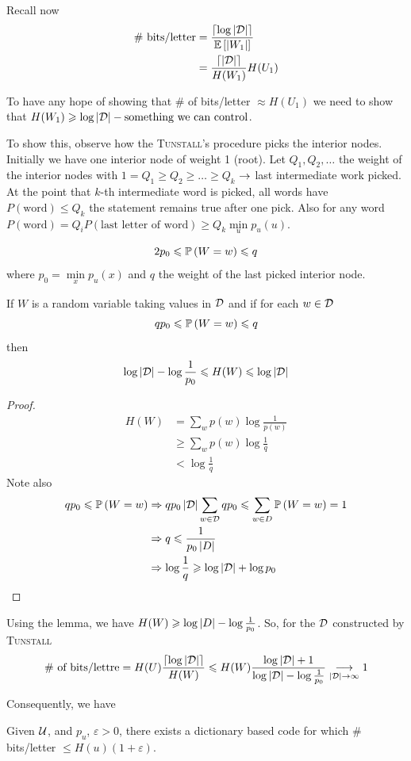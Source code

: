 Recall now 
\[
    \begin{aligned}
        \text{\# bits/letter} &= \frac{ \left\lceil \log\left\lvert\mathcal{D}\right\rvert \right\rceil}{\mathbb{E}\left[ \left\lvert W_1\right\rvert \right]}\\
        &= \frac{\left\lceil \left\lvert\mathcal{D}\right\rvert \right\rceil}{H(W_1)} H(U_1)
    \end{aligned}
\]

To have any hope of showing that \# of bits/letter $\approx H(U_1)$ we need to show that $H(W_1) \geqslant \log \left\lvert\mathcal{D}\right\rvert - \text{something we can control}$.

To show this, observe how the \textsc{Tunstall}'s procedure picks the interior nodes. Initially we have one interior node of weight 1 (root). Let $Q_1,Q_2,\ldots$ the weight of the interior nodes with $1=Q_1 \geqslant Q_2 \geqslant \ldots \geqslant Q_k$ $\rightarrow$ last intermediate work picked. At the point that $k$-th intermediate word is picked, all words have $P(\text{word}) \leqslant Q_k$ the statement remains true after one pick. Also for any word $P(\text{word}) = Q_i P(\text{last letter of word}) \geqslant Q_k \min\limits_up_u(u)$.

\[
    2p_0 \leqslant \mathbb{P}\left( W=w \right) \leqslant q
\]
where
$p_0= \min\limits_x p_u(x)$ and $q$ the weight of the last picked interior node.

\begin{lemma}
    If $W$ is a random variable taking values in $\mathcal{D}$ and if for each $w\in\mathcal{D}$
    \[
        qp_0 \leqslant \mathbb{P}\left( W=w \right)\leqslant q
    \]
    then
    \[
        \log \left\lvert\mathcal{D}\right\rvert  - \log \frac{1}{p_0} \leqslant H(W) \leqslant \log \left\lvert\mathcal{D}\right\rvert
    \]
\end{lemma}
\begin{proof}
    \[
        \begin{aligned}
            H(W) &= \sum\limits_w p(w) \log \frac{1}{p(w)}\\
            &\geqslant \sum_w p(w) \log \frac{1}{q}\\
            &< \log \frac{1}{q}
        \end{aligned}
    \]
    Note also
    \[
        \begin{aligned}           
            qp_0 \leqslant \mathbb{P}\left( W=w \right) &\Rightarrow qp_0\left\lvert\mathcal{D}\right\rvert\sum\limits_{w\in\mathcal{D}} qp_0 \leqslant \sum\limits_{w \in D}\mathbb{P}\left( W=w \right) = 1\\
            &\Rightarrow q\leqslant \frac{1}{p_0\left\lvert D\right\rvert}\\
            &\Rightarrow \log \frac{1}{q} \geqslant \log\left\lvert\mathcal{D}\right\rvert + \log p_0
        \end{aligned}
    \]
\end{proof}

Using the lemma, we have $H(W) \geqslant \log\left\lvert D\right\rvert - \log \frac{1}{p_0}$. So, for the $\mathcal{D}$ constructed by \textsc{Tunstall}
\[
    \text{\# of bits/lettre} = H(U) \frac{\left\lceil \log\left\lvert\mathcal{D}\right\rvert \right\rceil}{H(W)} \leqslant H(W) \frac{\log\left\lvert\mathcal{D}\right\rvert+1}{\log\left\lvert\mathcal{D}\right\rvert - \log\frac{1}{p_0}} \underset{\left\lvert\mathcal{D}\right\rvert \to \infty}{\longrightarrow} 1
\]

Consequently, we have
\begin{corollary}
    Given $\mathcal{U}$, and $p_u$, $\varepsilon > 0$, there exists a dictionary based code for which \# bits/letter $\leqslant H(u)(1+\varepsilon)$.
\end{corollary}